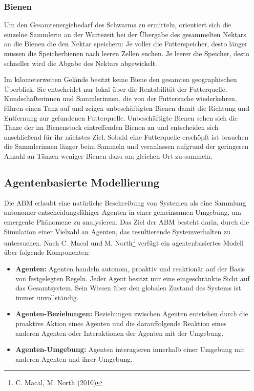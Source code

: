 \documentclass[a4paper, 11pt]{article}
\begin{document}
\subsubsection{Bienen}
Um den Gesamtenergiebedarf des Schwarms zu ermitteln, orientiert sich die einzelne Sammlerin an der Wartezeit bei der Übergabe des gesammelten Nektars an die Bienen die den Nektar speichern: Je voller die Futterspeicher, desto länger müssen die Speicherbienen nach leeren Zellen suchen. Je leerer die Speicher, desto schneller wird die Abgabe des Nektars abgewickelt.
\par Im kilometerweiten Gelände besitzt keine Biene den gesamten geographischen Überblick. Sie entscheidet nur lokal über die Rentabilität der Futterquelle. Kundschafterinnen und Sammlerinnen, die von der Futtersuche wiederkehren, führen einen Tanz auf und zeigen unbeschäftigten Bienen damit die Richtung und Entfernung zur gefundenen Futterquelle. Unbeschäftigte Bienen sehen sich die Tänze der im Bienenstock eintreffenden Bienen an und entscheiden sich anschließend für ihr nächstes Ziel. Sobald eine Futterquelle erschöpft ist brauchen die Sammlerinnen länger beim Sammeln und veranlassen aufgrund der geringeren Anzahl an Tänzen weniger Bienen dazu am gleichen Ort zu sammeln.
\newpage
\subsection{Agentenbasierte Modellierung}
Die \ac{ABM} erlaubt eine natürliche Beschreibung von Systemen als eine Sammlung autonomer entscheidungsfähiger Agenten in einer gemeinsamen Umgebung, um emergente Phänomene zu analysieren. Das Ziel der \acs{ABM} besteht darin, durch die Simulation einer Vielzahl an Agenten, das resultierende Systemverhalten zu untersuchen. Nach C. Macal und M. North\footnote{C. Macal, M. North (2010)} verfügt ein agentenbasiertes Modell über folgende Komponenten:
\begin{itemize}
	\item \textbf{Agenten:} Agenten handeln autonom, proaktiv und reaktionär auf der Basis von festgelegten Regeln. Jeder Agent besitzt nur eine eingeschränkte Sicht auf das Gesamtsystem. Sein Wissen über den globalen Zustand des Systems ist immer unvollständig.
	\item \textbf{Agenten-Beziehungen:} Beziehungen zwischen Agenten entstehen durch die proaktive Aktion eines Agenten und die darauffolgende Reaktion eines anderen Agenten oder Interaktionen der Agenten mit der Umgebung.
	\item \textbf{Agenten-Umgebung:} Agenten interagieren innerhalb einer Umgebung mit anderen Agenten und ihrer Umgebung.
\end{itemize}
\end{document}
